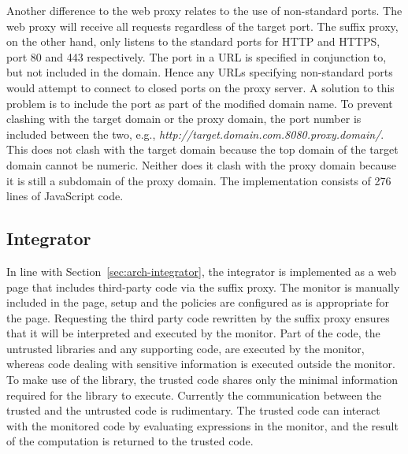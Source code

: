 \documentclass{llncs}
\newcommand{\todo}[1]{\colorbox{red}{\textcolor{white}{\sffamily\bfseries\scriptsize TODO}} \textcolor{red}{#1} \textcolor{red}{$\blacktriangleleft$}}
\begin{document}
Another difference to the web proxy relates to the use of non-standard ports.
The web proxy will receive all requests regardless of the target port. The 
suffix proxy, on the other hand, only listens to the standard ports for HTTP and HTTPS, port 80 and 
443 respectively. The port in a URL is specified in conjunction to, but not included in the domain.
Hence any URLs specifying non-standard ports would attempt to connect to closed 
ports on the proxy server. A solution to this problem is to include the port as part 
of the modified domain name. To prevent clashing with the target domain or the proxy domain, 
the port number is included between the two, e.g., \emph{http://target.domain.com.8080.proxy.domain/}.
This does not clash with the target domain because the top domain of the target domain cannot be numeric.
Neither does it clash with the proxy domain because it is still a subdomain of the proxy domain.
%
The implementation consists of 276 lines of JavaScript code.

\subsection{Integrator}


In line with Section~\ref{sec:arch-integrator}, the integrator is implemented as 
a web page that includes third-party code via the suffix proxy. The monitor is 
manually included in the page, setup and the policies are configured as is 
appropriate for the page. Requesting the third party code rewritten by the suffix 
proxy ensures that it will be interpreted and executed by the 
monitor.
%
Part of the code, the untrusted libraries and any supporting code,
are executed by the monitor, whereas code dealing with sensitive 
information is executed outside the monitor. To make use of the library, 
the trusted code shares only the minimal information required for the 
library to execute. Currently the communication between the trusted and the 
untrusted code is rudimentary. The trusted code can interact with the monitored 
code by evaluating expressions in the monitor, and the result of the computation
is returned to the trusted code. 
\end{document}
